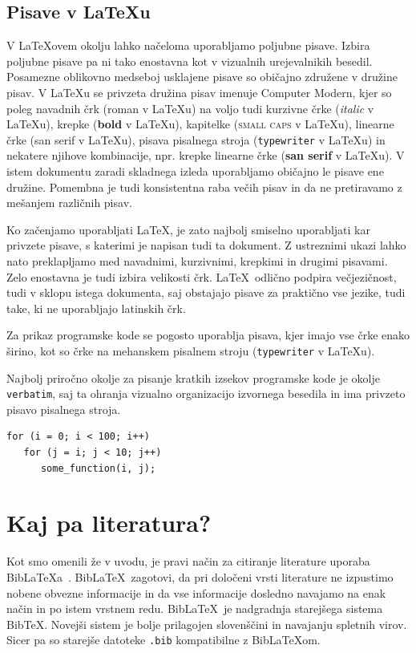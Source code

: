 \documentclass[a4paper,12pt,openright]{book}
\newcommand{\BibLaTeX}{{\sc Bib}\LaTeX}
\newcommand{\BibTeX}{{\sc Bib}\TeX}
\begin{document}
\section{Pisave v \LaTeX u}

V  \LaTeX ovem okolju lahko načeloma uporabljamo poljubne pisave.
Izbira poljubne pisave pa ni tako enostavna kot v vizualnih urejevalnikih besedil.
Posamezne oblikovno medseboj usklajene pisave so običajno združene v družine pisav.
V \LaTeX u se privzeta družina pisav imenuje Computer Modern,
kjer so poleg navadnih črk (roman v \LaTeX u) na voljo tudi kurzivne črke (\textit{italic} v \LaTeX u),
krepke (\textbf{bold} v \LaTeX u), kapitelke (\textsc{small caps} v \LaTeX u), linearne črke ({\textsf{san serif} v \LaTeX u}), pisava pisalnega stroja (\texttt{typewriter} v \LaTeX u) in nekatere njihove kombinacije, npr. krepke linearne črke
({\textbf{\textsf{san serif}} v \LaTeX u}).
V istem dokumentu zaradi skladnega izleda uporabljamo običajno le pisave ene družine.
Pomembna je tudi konsistentna raba večih pisav in da ne pretiravamo z mešanjem različnih pisav.

Ko začenjamo uporabljati \LaTeX, je zato najbolj smiselno uporabljati kar privzete pisave, s katerimi je napisan tudi ta dokument.
Z ustreznimi ukazi  lahko nato preklapljamo med navadnimi, kurzivnimi, krepkimi in drugimi pisavami.
Zelo enostavna je tudi izbira velikosti črk.
\LaTeX\  odlično podpira večjezičnost, tudi v sklopu istega dokumenta, saj obstajajo pisave za praktično vse jezike, tudi take, ki ne uporabljajo latinskih črk.

Za prikaz programske kode se pogosto uporablja pisava, kjer imajo vse črke enako širino, kot so  črke na mehanskem pisalnem stroju ({\texttt{typewriter} v \LaTeX u}).

Najbolj priročno okolje za pisanje kratkih izsekov programske kode je okolje \texttt{verbatim}, saj ta ohranja vizualno organizacijo izvornega besedila in ima privzeto pisavo pisalnega stroja.

\begin{verbatim}
for (i = 0; i < 100; i++)
   for (j = i; j < 10; j++)
      some_function(i, j);
\end{verbatim}




\chapter{Kaj pa literatura?}
\label{lit}

Kot smo omenili že v uvodu, je pravi način za citiranje literature uporaba \BibLaTeX{a}~\cite{biblatex}.
\BibLaTeX\ zagotovi, da pri določeni vrsti literature ne izpustimo
nobene obvezne informacije
in da vse informacije dosledno navajamo na enak način in po istem vrstnem redu.
\BibLaTeX\ je nadgradnja starejšega sistema \BibTeX. Novejši sistem je bolje prilagojen slovenščini in navajanju spletnih virov. Sicer pa so starejše datoteke \texttt{.bib} kompatibilne z \BibLaTeX om.
\end{document}
